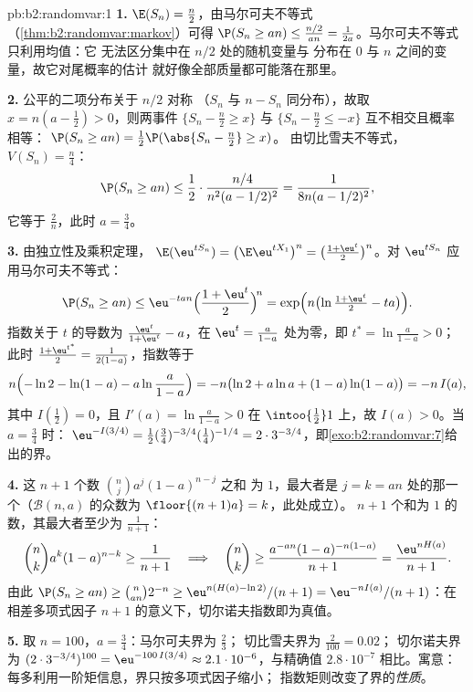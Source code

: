 \begin{solution}{pb:b2:randomvar:1}
\textbf{1.} $\E(S_n) = \frac n2$，由马尔可夫不等式
（\cref{thm:b2:randomvar:markov}）可得 $\P(S_n \geq an) \leq
\frac{n/2}{an} = \frac1{2a}$。马尔可夫不等式只利用均值：它
无法区分集中在 $n/2$ 处的随机变量与
分布在 $0$ 与 $n$ 之间的变量，故它对尾概率的估计
就好像全部质量都可能落在那里。

\textbf{2.} 公平的二项分布关于 $n/2$ 对称
（$S_n$ 与 $n - S_n$ 同分布），故取 $x = n(a -
\frac12) > 0$，则两事件 $\{S_n - \frac n2 \geq x\}$ 与
$\{S_n - \frac n2 \leq -x\}$ 互不相交且概率相等：
$\P(S_n \geq an) = \frac12\P(\abs{S_n - \frac n2} \geq x)$。
由切比雪夫不等式，$V(S_n) = \frac n4$：
\[
\P(S_n \geq an)
\leq \frac12\cdot\frac{n/4}{n^2(a - 1/2)^2}
= \frac1{8n(a - 1/2)^2},
\]
它等于 $\frac2n$，此时 $a = \frac34$。

\textbf{3.} 由独立性及乘积定理，
$\E(\eu^{tS_n}) = \bigl(\E \eu^{tX_1}\bigr)^n = \bigl(\frac{1
+ \eu^t}2\bigr)^n$。对 $\eu^{tS_n}$ 应用马尔可夫不等式：
\[
\P(S_n \geq an) \leq \eu^{-tan}\Bigl(\frac{1 +
\eu^t}2\Bigr)^{\!n} = \exp\Bigl(n\bigl(\ln\tfrac{1 +
\eu^t}2 - ta\bigr)\Bigr).
\]
指数关于 $t$ 的导数为 $\frac{\eu^t}{1 + \eu^t}
- a$，在 $\eu^t = \frac a{1-a}$ 处为零，即 $t^* =
\ln\frac a{1-a} > 0$；此时 $\frac{1 + \eu^{t^*}}2 =
\frac1{2(1-a)}$，指数等于
\[
n\Bigl(-\ln 2 - \ln(1-a) - a\ln\frac a{1-a}\Bigr)
= -n\bigl(\ln2 + a\ln a + (1-a)\ln(1-a)\bigr) = -n\,I(a),
\]
其中 $I(\frac12) = 0$，且 $I'(a) = \ln\frac a{1-a} > 0$
在 $\intoo{\frac12}1$ 上，故 $I(a) > 0$。当 $a = \frac34$ 时：
$\eu^{-I(3/4)} = \frac12(\tfrac34)^{-3/4}(\tfrac14)^{-1/4} =
2\cdot3^{-3/4}$，即\cref{exo:b2:randomvar:7}给出的界。

\textbf{4.} 这 $n + 1$ 个数 $\binom nja^j(1-a)^{n-j}$ 之和
为 $1$，最大者是 $j = k = an$ 处的那一个（$\mathcal B(n, a)$
的众数为 $\floor{(n+1)a} = k$，此处成立）。
$n + 1$ 个和为 $1$ 的数，其最大者至少为
$\frac1{n+1}$：
\[
\binom nk a^k(1-a)^{n-k} \geq \frac1{n+1}
\quad\Longrightarrow\quad
\binom nk \geq \frac{a^{-an}(1-a)^{-n(1-a)}}{n+1}
= \frac{\eu^{nH(a)}}{n+1}.
\]
由此 $\P(S_n \geq an) \geq \binom{n}{an}2^{-n} \geq
\eu^{n(H(a) - \ln2)}/(n+1) = \eu^{-nI(a)}/(n+1)$：在
相差多项式因子 $n + 1$ 的意义下，切尔诺夫指数即为真值。

\textbf{5.} 取 $n = 100$，$a = \frac34$：马尔可夫界为 $\frac23$；
切比雪夫界为 $\frac2{100} = 0.02$；
切尔诺夫界为 $(2\cdot3^{-3/4})^{100} = \eu^{-100\,I(3/4)} \approx
2.1\cdot10^{-6}$，与精确值 $2.8\cdot10^{-7}$ 相比。寓意：
每多利用一阶矩信息，界只按多项式因子缩小；
指数矩则改变了界的\emph{性质}。


\end{solution}
